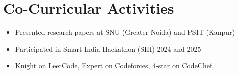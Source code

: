 \documentclass[a4paper,10pt]{article}
\begin{document}
\section*{Co-Curricular Activities}
\begin{itemize}[leftmargin=0.4cm, itemsep=0pt, topsep=2pt]
    \item Presented research papers at SNU (Greater Noida) and PSIT (Kanpur)
    \item Participated in Smart India Hackathon (SIH) 2024 and 2025
    \item Knight on LeetCode, Expert on Codeforces, 4-star on CodeChef,
\end{itemize}
\end{document}
